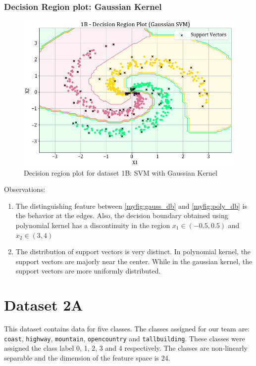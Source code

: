 \documentclass[11pt,a4paper]{article}
\newcommand{\noi}{\noindent}
\def\tt#1{\texttt{#1}}
\begin{document}
\subsubsection{Decision Region plot: Gaussian Kernel}

\begin{figure}[H]
    \centering
    \includegraphics[scale=0.5]{images/1B_SVM_gauss_decision_plot.png}
    \caption{Decision region plot for dataset 1B: SVM with Gaussian Kernel}
    \label{myfig:gauss_db}
\end{figure}

\noi
Observations:
\begin{enumerate}
\item The distinguishing feature between \autoref{myfig:gauss_db} and \autoref{myfig:poly_db} is the behavior at the edges. Also, the decision boundary obtained using polynomial kernel has a discontinuity in the region $x_1 \in (-0.5,0.5)$ and $x_2 \in (3,4)$
\item The distribution of support vectors is very distinct. In polynomial kernel, the support vectors are majorly near the center. While in the gaussian kernel, the support vectors are more uniformly distributed.
\end{enumerate}
\break
\section{Dataset 2A}
This dataset contains data for five classes. The classes assigned for our team are: \tt{coast}, \tt{highway}, \tt{mountain}, \tt{opencountry} and \tt{tallbuilding}. These classes were assigned the class label 0, 1, 2, 3 and 4 respectively. The classes are non-linearly separable and the dimension of the feature space is 24.
\end{document}
